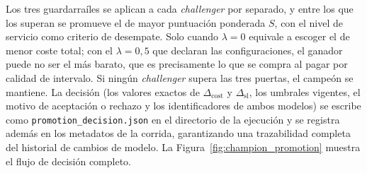 Los tres guardarraíles se aplican a cada \textit{challenger} por separado, y entre los que los superan se promueve el de mayor puntuación ponderada $S$, con el nivel de servicio como criterio de desempate. Solo cuando $\lambda = 0$ equivale a escoger el de menor coste total; con el $\lambda = 0{,}5$ que declaran las configuraciones, el ganador puede no ser el más barato, que es precisamente lo que se compra al pagar por calidad de intervalo. Si ningún \textit{challenger} supera las tres puertas, el campeón se mantiene. La decisión (los valores exactos de $\Delta_{\text{cost}}$ y $\Delta_{\text{sl}}$, los umbrales vigentes, el motivo de aceptación o rechazo y los identificadores de ambos modelos) se escribe como \texttt{promotion\_}\allowbreak\texttt{decision.json} en el directorio de la ejecución y se registra además en los metadatos de la corrida, garantizando una trazabilidad completa del historial de cambios de modelo. La Figura~\ref{fig:champion_promotion} muestra el flujo de decisión completo.

